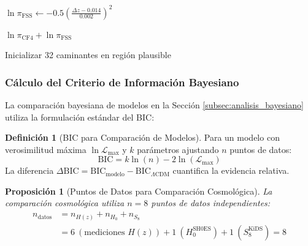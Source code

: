 \documentclass[11pt, a4paper]{article}
\theoremstyle{plain}
\newtheorem{proposicion}[teorema]{Proposición}
\theoremstyle{definition}
\newtheorem{definicion}[teorema]{Definición}
\begin{document}
\begin{algorithm}[htbp]
{    
    $\ln\pi_{\text{FSS}} \gets -0.5\left(\frac{\Delta z - 0.014}{0.002}\right)^2$\;
    
    \Return $\ln\pi_{\text{CF4}} + \ln\pi_{\text{FSS}}$\;
}


Inicializar 32 caminantes en región plausible\;
\caption{Inferencia bayesiana para parámetros de TSM}
\label{alg:bayesian_inference}
\end{algorithm}

\subsubsection{Cálculo del Criterio de Información Bayesiano}

La comparación bayesiana de modelos en la Sección \ref{subsec:analisis_bayesiano} utiliza la formulación estándar del BIC:

\begin{definicion}[BIC para Comparación de Modelos]
Para un modelo con verosimilitud máxima $\ln\mathcal{L}_{\text{max}}$ y $k$ parámetros ajustando $n$ puntos de datos:
\begin{equation}
\text{BIC} = k \ln(n) - 2 \ln(\mathcal{L}_{\text{max}})
\end{equation}
La diferencia $\Delta\text{BIC} = \text{BIC}_{\text{modelo}} - \text{BIC}_{\Lambda\text{CDM}}$ cuantifica la evidencia relativa.
\end{definicion}

\begin{proposicion}[Puntos de Datos para Comparación Cosmológica]
La comparación cosmológica utiliza $n = 8$ puntos de datos independientes:
\begin{align}
n_{\text{datos}} &= n_{H(z)} + n_{H_0} + n_{S_8} \\
&= 6\ (\text{mediciones } H(z)) + 1\ (H_0^{\text{SH0ES}}) + 1\ (S_8^{\text{KiDS}}) = 8
\end{align}
\end{proposicion}
\end{document}
